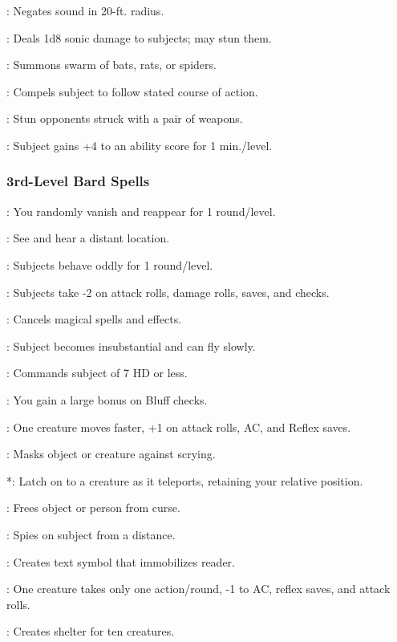 \begin{list}{}{\leftmargin=1em}
\item {}: Negates sound in 20-ft. radius.
\item {}: Deals 1d8 sonic damage to subjects; may stun them.
\item {}: Summons swarm of bats, rats, or spiders.
\item {}: Compels subject to follow stated course of action.
\item {}: Stun opponents struck with a pair of weapons.
\item {}: Subject gains +4 to an ability score for 1 min./level.
\end{list}
\subsubsection{3rd-Level Bard Spells}
\begin{list}{}{\leftmargin=1em}
\item {}: You randomly vanish and reappear for 1 round/level.
\item {}: See and hear a distant location.
\item {}: Subjects behave oddly for 1 round/level.
\item {}: Subjects take -2 on attack rolls, damage rolls, saves, and checks.
\item {}: Cancels magical spells and effects.
\item {}: Subject becomes insubstantial and can fly slowly.
\item {}: Commands subject of 7 HD or less.
\item {}: You gain a large bonus on Bluff checks.
\item {}: One creature moves faster, +1 on attack rolls, AC, and Reflex saves.
\item {}: Masks object or creature against scrying.
\item {}*: Latch on to a creature as it teleports, retaining your relative position.
\item {}: Frees object or person from curse.
\item {}: Spies on subject from a distance.
\item {}: Creates text symbol that immobilizes reader.
\item {}: One creature takes only one action/round, -1 to AC, reflex saves, and attack rolls.
\item {}: Creates shelter for ten creatures.
\end{list}
